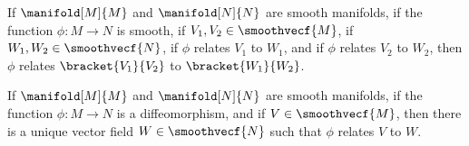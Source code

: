         \begin{theorem}
            If $\manifold[M]{M}$ and $\manifold[N]{N}$ are smooth manifolds,
            if the function $\phi:M\rightarrow{N}$ is smooth, if
            $V_{1},V_{2}\in\smoothvecf{M}$, if
            $W_{1},W_{2}\in\smoothvecf{N}$, if $\phi$ relates $V_{1}$ to
            $W_{1}$, and if $\phi$ relates $V_{2}$ to $W_{2}$, then
            $\phi$ relates $\bracket{V_{1}}{V_{2}}$ to
            $\bracket{W_{1}}{W_{2}}$.
        \end{theorem}
        \begin{theorem}
            If $\manifold[M]{M}$ and $\manifold[N]{N}$ are smooth manifolds,
            if the function $\phi:M\rightarrow{N}$ is a diffeomorphism, and
            if $V\in\smoothvecf{M}$, then there is a unique vector field
            $W\in\smoothvecf{N}$ such that $\phi$ relates $V$ to $W$.
        \end{theorem}
